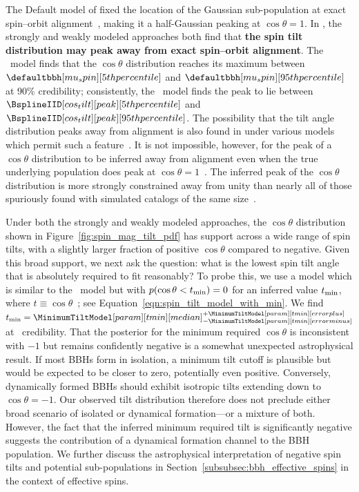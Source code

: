 The Default model of \gwtcthree fixed the location of the Gaussian sub-population at exact spin--orbit alignment~\citep{Vitale:2015tea,Talbot:2017yur,KAGRA:2021duu}, making it a half-Gaussian peaking at $\cos\theta=1$.
In \gwtcfour, the strongly and weakly modeled approaches both find that \textbf{the spin tilt distribution may peak away from exact spin--orbit alignment}. 
The ~model finds that the $\cos\theta$ distribution reaches its maximum between $\defaultbbh[mu_spin][5th percentile]$ and $\defaultbbh[mu_spin][95th percentile]$ at 90\% credibility; consistently, the \BSpline~model finds the peak to lie between $\BsplineIID[cos_tilt][peak][5th percentile]$ and $\BsplineIID[cos_tilt][peak][95th percentile]$.
The possibility that the tilt angle distribution peaks away from alignment is also found in \gwtcthree under various models which permit such a feature~\citep{Vitale:2022dpa,Edelman:2022ydv,Golomb:2022bon}.
It is not impossible, however, for the peak of a $\cos\theta$ distribution to be inferred away from alignment even when the true underlying population does peak at $\cos\theta=1$~\citep{Vitale:2025lms}.
The inferred peak of the \gwtcfour $\cos\theta$ distribution is more strongly constrained away from unity than nearly all of those spuriously found with simulated catalogs of the same size~\citep[cf.~Figure~\ref{fig:spin_mags_tilts_comparison_cornerplot} with Figure 4 of][]{Vitale:2025lms}.

Under both the strongly and weakly modeled approaches, the $\cos\theta$ distribution shown in Figure~\ref{fig:spin_mag_tilt_pdf} has support across a wide range of spin tilts, with a slightly larger fraction of positive $\cos\theta$ compared to negative.
Given this broad support, we next ask the question: what is the lowest spin tilt angle that is absolutely required to fit \gwtcfour reasonably?
To probe this, we use a model which is similar to the ~model but with $p(\cos\theta < t_{\rm min}) = 0$ for an inferred value $t_{\rm min}$, where $t\equiv \cos\theta$~\citep{Tong:2022iws,Callister:2022qwb}; see Equation~\eqref{eqn:spin_tilt_model_with_min}.
We find $t_{\rm min} = \CIPlusMinus{\MinimumTiltModel[param][tmin]}$ at \confidenceLevel~credibility.
That the posterior for the minimum required $\cos\theta$ is inconsistent with $-1$ but remains confidently negative is a somewhat unexpected astrophysical result.
If most \acp{BBH} form in isolation, a minimum tilt cutoff is plausible but would be expected to be closer to zero, potentially even positive. 
Conversely, dynamically formed \acp{BBH} should exhibit isotropic tilts extending down to $\cos\theta = -1$. 
Our observed tilt distribution therefore does not preclude either broad scenario of isolated or dynamical formation---or a mixture of both.
However, the fact that the inferred minimum required tilt is significantly negative suggests the contribution of a dynamical formation channel to the \ac{BBH} population.
We further discuss the astrophysical interpretation of negative spin tilts and potential sub-populations in Section~\ref{subsubsec:bbh_effective_spins} in the context of effective spins.


